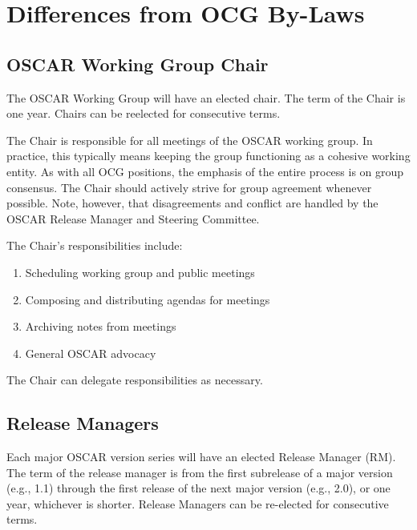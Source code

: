 %
%
%

\section{Differences from OCG By-Laws}


\subsection{OSCAR Working Group Chair}

The OSCAR Working Group will have an elected chair.  The term of the
Chair is one year.  Chairs can be reelected for consecutive terms.

The Chair is responsible for all meetings of the OSCAR working group.
In practice, this typically means keeping the group functioning as a
cohesive working entity.  As with all OCG positions, the emphasis of
the entire process is on group consensus.  The Chair should actively
strive for group agreement whenever possible.  Note, however, that
disagreements and conflict are handled by the OSCAR Release Manager
and Steering Committee.

The Chair's responsibilities include:

\begin{enumerate}
\item Scheduling working group and public meetings
\item Composing and distributing agendas for meetings
\item Archiving notes from meetings
\item General OSCAR advocacy
\end{enumerate}

The Chair can delegate responsibilities as necessary.


\subsection{Release Managers}

Each major OSCAR version series will have an elected Release Manager
(RM).  The term of the release manager is from the first subrelease of
a major version (e.g., 1.1) through the first release of the next
major version (e.g., 2.0), or one year, whichever is shorter.  Release
Managers can be re-elected for consecutive terms.

